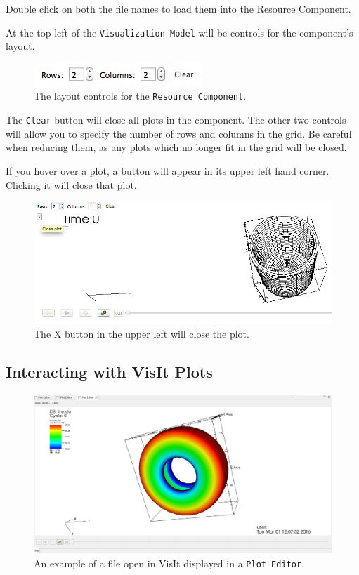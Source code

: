 Double click on both the file names to load them into the Resource Component.

At the top left of the \texttt{Visualization Model} will be controls for the
component's layout.

\begin{figure}[!h]
\includegraphics{images/ResourceComponentControls}
\centering
\caption{The layout controls for the \texttt{Resource Component}.}
\label{fig:resourcecomponentcontrols}
\end{figure}

The \texttt{Clear} button will close all plots in the component. The other two
controls will allow you to specify the number of rows and columns in the grid.
Be careful when reducing them, as any plots which no longer fit in the grid will
be closed.

If you hover over a plot, a button will appear in its upper left hand corner.
Clicking it will close that plot. 

\begin{figure}[!h]
\includegraphics[width=12cm]{images/ClosePlotButton}
\centering
\caption{The X button in the upper left will close the plot.}
\label{fig:closeplotbutton}
\end{figure}

\subsection{Interacting with VisIt Plots}

\begin{figure}[!h]
\includegraphics[width=12cm]{images/VisItPlot}
\centering
\caption{An example of a file open in VisIt displayed in a \texttt{Plot
Editor}.}
\label{fig:visitplot}
\end{figure}

